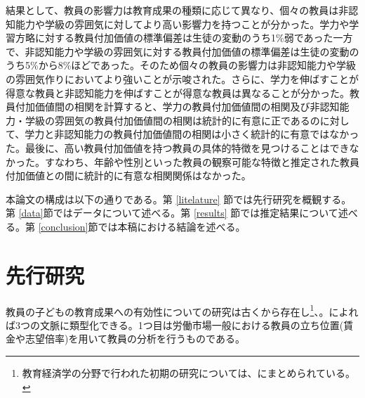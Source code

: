 \documentclass[a4paper,12pt]{article}
\begin{document}
結果として、教員の影響力は教育成果の種類に応じて異なり、個々の教員は非認知能力や学級の雰囲気に対してより高い影響力を持つことが分かった。学力や学習方略に対する教員付加価値の標準偏差は生徒の変動のうち1\%弱であった一方で、非認知能力や学級の雰囲気に対する教員付加価値の標準偏差は生徒の変動のうち5\%から8\%ほどであった。そのため個々の教員の影響力は非認知能力や学級の雰囲気作りにおいてより強いことが示唆された。さらに、学力を伸ばすことが得意な教員と非認知能力を伸ばすことが得意な教員は異なることが分かった。教員付加価値間の相関を計算すると、学力の教員付加価値間の相関及び非認知能力・学級の雰囲気の教員付加価値間の相関は統計的に有意に正であるのに対して、学力と非認知能力の教員付加価値間の相関は小さく統計的に有意ではなかった。最後に、高い教員付加価値を持つ教員の具体的特徴を見つけることはできなかった。すなわち、年齢や性別といった教員の観察可能な特徴と推定された教員付加価値との間に統計的に有意な相関関係はなかった。


本論文の構成は以下の通りである。第 \ref{litelature} 節では先行研究を概観する。第 \ref{data}節ではデータについて述べる。第 \ref{results} 節では推定結果について述べる。第 \ref{conclusion}節では本稿における結論を述べる。

\section{先行研究\label{litelature}}

教員の子どもの教育成果への有効性についての研究は古くから存在し\footnote{教育経済学の分野で行われた初期の研究については、\cite{hanushek2006teacher}にまとめられている。}、。\cite{hanushek2006teacher}によれば3つの文脈に類型化できる。1つ目は労働市場一般における教員の立ち位置(賃金や志望倍率)を用いて教員の分析を行うものである。
\end{document}
